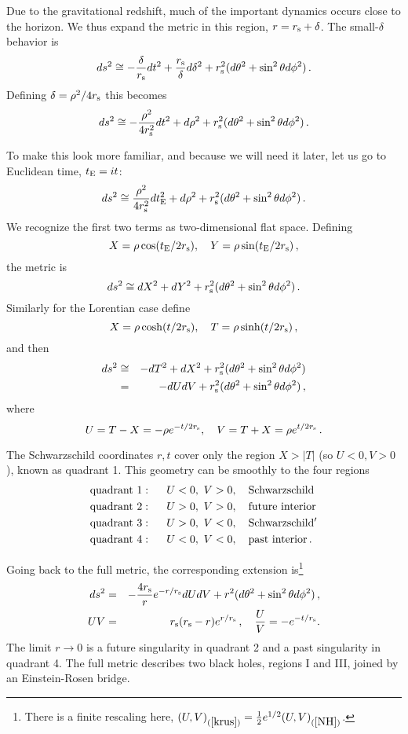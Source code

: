 \documentclass[12pt]{article}
\newcommand{\be}{\begin{equation}}
\newcommand{\ee}{\end{equation}}
\newcommand{\bea}{\begin{eqnarray}}
\newcommand{\eea}{\end{eqnarray}}
\newcommand{\rmx}{\rm}
\newcommand{\rs}{r_{\rmx s}}
\begin{document}
Due to the gravitational redshift, much of the important dynamics occurs close to the horizon.  We  thus expand the metric in this region, $r =  r_{\rmx s} + \delta$.
The small-$\delta$ behavior is
\be
ds^2 \cong - \frac{\delta}{ r_{\rmx s}} dt^2 + \frac{ r_{\rmx s}}{\delta} d\delta^2 +  r_{\rmx s}^2 (d\theta^2 + \sin^2\theta d\phi^2)\,.
\ee
Defining $\delta = \rho^2/4  r_{\rmx s}$ this becomes
\be
ds^2 \cong - \frac{\rho^2}{4 r_{\rmx s}^2} dt^2 +  d\rho^2 +  r_{\rmx s}^2 (d\theta^2 + \sin^2\theta d\phi^2)\,.
\ee

To make this look more familiar, and because we will need it later, let us go to Euclidean time, $t_{\rmx E} = it$:
\be
ds^2 \cong  \frac{\rho^2}{4 r_{\rmx s}^2} dt_{\rmx E}^2 +  d\rho^2 +  r_{\rmx s}^2 (d\theta^2 + \sin^2\theta d\phi^2)\,.
\ee
We recognize the first two terms as two-dimensional flat space.  Defining 
\be
X = \rho \cos (t_{\rmx E}/2r_{\rmx s}), \quad Y = \rho \sin (t_{\rmx E}/2r_{\rmx s})\,, \label{xy}
\ee
the metric is
\be
ds^2 \cong  dX^2 + dY^2 +  r_{\rmx s}^2 (d\theta^2 + \sin^2\theta d\phi^2)\,.
\ee
Similarly for the Lorentian case define 
\be
X = \rho \cosh (t/2r_{\rmx s}), \quad T = \rho \sinh (t/2r_{\rmx s})\,,
\ee
 and then
\bea
ds^2 &\cong&  -dT^2 + dX^2 +  r_{\rmx s}^2 (d\theta^2 + \sin^2\theta d\phi^2)  \nonumber\\
&=& -dU dV +  r_{\rmx s}^2 (d\theta^2 + \sin^2\theta d\phi^2)  
\,, \label{NH}
\eea
where 
\be
U = T-X = - \rho e^{-t/2r_{\rmx s}}, \quad V= T+X = \rho e^{t/2r_{\rmx s}} \label{uv}
\,.
\ee

The Schwarzschild coordinates $r,t$ cover only the region $X > |T|$ (so $U<0, V>0$), known as quadrant 1.  This geometry can be smoothly to the four regions
\bea
{\rm quadrant }\ 1:\ \ \  \ \  & U<0,\ V>0, \ \ \ {\rm Schwarzschild}  \nonumber\\
{\rm quadrant }\ 2:\ \ \  \ \  & U>0,\ V>0,  \ \ \ {\rm future\ interior} \nonumber\\
{\rm quadrant }\ 3:\ \ \  \ \  & U>0,\ V<0,  \ \ \ {\rm Schwarzschild'} \nonumber\\
{\rm quadrant }\ 4:\ \ \  \ \  & U<0,\ V<0,  \ \ \ {\rm past\ interior}\,.  \label{quad}
\eea

Going back to the full metric, the corresponding extension is\footnote{There is a finite rescaling here, $(U,V)_{(\ref{krus})} =  \frac12 e^{1/2} (U,V)_{(\ref{NH})}$. }
\bea
ds^2 &=& -\frac{4 r_{\rmx s}}{r} e^{-r/r_{\rmx s}} dU dV + r^2 (d\theta^2 + \sin^2\theta d\phi^2) \,, 
\nonumber\\
UV &=& \rs ( {r_{\rmx s}  - {r} }) e^{r/\rs} \,,\quad \frac{U}{V}= -e^{-t/r_{\rmx s}}. \label{krus}
\eea
The limit $r \to 0$ is a future singularity in quadrant 2 and a past singularity in quadrant 4.
The full metric describes two black holes, regions I and III, joined by an Einstein-Rosen bridge.
\end{document}
